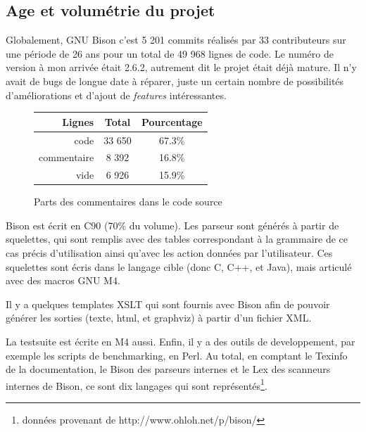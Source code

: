\documentclass[a4paper,11pt,twoside,final]{article}
\begin{document}
  \subsection{Age et volumétrie du projet}

  Globalement, GNU Bison c'est 5 201 commits réalisés par 33 contributeurs sur
  une période de 26 ans pour un total de 49 968 lignes de code. Le numéro de
  version à mon arrivée était 2.6.2, autrement dit le projet était déjà mature.
  Il n'y avait de bugs de longue date à réparer, juste un certain nombre de
  possibilités d'améliorations et d'ajout de \textit{features} intéressantes.

  \begin{figure}[H]
    \begin{center}
      \begin{tabular}{| r | c | c |}
        \hline
        Lignes & Total & Pourcentage \\
        \hline
        code & 33 650 & 67.3\% \\
        commentaire & 8 392 & 16.8\% \\
        vide & 6 926 & 15.9\% \\
        \hline
      \end{tabular}
      \caption{Parts des commentaires dans le code source}
    \end{center}
  \end{figure}

  Bison est écrit en C90 (70\% du volume). Les parseur sont générés à partir de
  squelettes, qui sont remplis avec des tables correspondant à la grammaire de
  ce cas précis d'utilisation ainsi qu'avec les action données par
  l'utilisateur. Ces squelettes sont écris dans le langage cible (donc C, C++,
  et Java), mais articulé avec des macros GNU M4.

  Il y a quelques templates XSLT qui sont fournis avec Bison afin de pouvoir
  générer les sorties (texte, html, et graphviz) à partir d'un fichier XML.

  La testsuite est écrite en M4 aussi. Enfin, il y a des outils de
  developpement, par exemple les scripts de benchmarking, en Perl. Au total,
  en comptant le Texinfo de la documentation, le Bison des parseurs internes et
  le Lex des scanneurs internes de Bison, ce sont dix langages qui sont
  représentés\footnote{données provenant de http://www.ohloh.net/p/bison/}.
\end{document}
